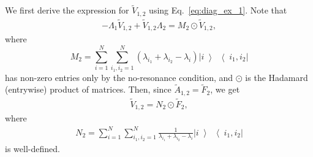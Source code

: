 \documentclass[superscriptaddress,onecolumn,nofootinbib,longbibliography,a4paper,accepted=2026-09-29]{quantumarticle}
\theoremstyle{plain}
\theoremstyle{definition}
\numberwithin{thm}{section}
\numberwithin{assumption}{section}
\numberwithin{lemma}{section}
\numberwithin{prop}{section}
\numberwithin{cor}{section}
\numberwithin{definition}{section}
\numberwithin{rmk}{section}
\numberwithin{equation}{section}
\newcommand{\ketbra}[2]   {\left|#1\middle\rangle\!\middle\langle#2\right|}
\newcommand{\lrb}[1]{\left ( #1 \right )}
\begin{document}
We first derive the expression for $\tilde{V}_{1,2}$ using Eq.~\eqref{eq:diag_ex_1}. Note that 
\begin{align}
    -\Lambda_1 \tilde{V}_{1,2} + \tilde{V}_{1,2} \Lambda_2 = M_2 \odot \tilde{V}_{1,2},    
\end{align}
where 
\begin{equation}
    M_2=\sum_{i=1}^N \sum_{i_1,i_2=1}^N \lrb{\lambda_{i_1}+\lambda_{i_2}-\lambda_{i}} \ketbra{i}{i_1,i_2}    
\end{equation}
has non-zero entries only by the no-resonance condition, and $\odot$ is the Hadamard (entrywise) product of matrices. Then, since $\tilde{A}_{1,2}=\tilde{F}_2$, we get
\begin{align}
    \tilde{V}_{1,2}=N_2 \odot \tilde{F}_2,    
\end{align}
where
\begin{align}
    N_2=\sum_{i=1}^N \sum_{i_1,i_2=1}^N \frac{1}{\lambda_{i_1}+\lambda_{i_2}-\lambda_{i}} \ketbra{i}{i_1,i_2}
\end{align}
is well-defined.
\end{document}
